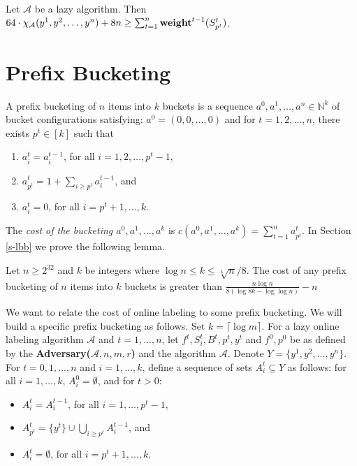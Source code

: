 \documentclass[runningheads,a4paper]{llncs}
\newcommand{\A}{\mathcal{A}}
\newcommand{\N}{\mathbb{N}}
\newcommand{\weight}{{\rm {\bf weight}}}
\begin{document}
\begin{corollary}\label{c-main}
Let $\A$ be a lazy algorithm. Then $64 \cdot \chi_\A(y^1,y^2,\dots,y^n) + 8n \ge \sum_{t=1}^n \weight^{t-1}(S^t_{p^t})$.
\end{corollary}


\section{Prefix Bucketing}

A prefix bucketing of $n$ items into $k$ buckets is a sequence $a^0,a^1,\dots,a^n\in \N^k$ of bucket configurations
satisfying: $a^0 = (0,0,\dots,0)$ and for $t=1,2,\dots,n$, there exists $p^{t} \in [k]$ such that
\begin{enumerate}
\item $a^t_i = a^{t-1}_i$, for all $i=1,2,\dots,p^{t}-1$, 
\item $a^t_{p^{t}} = 1+ \sum_{i\ge p^{t}} a^{t-1}_i$, and
\item $a^t_i = 0$, for all $i=p^{t}+1,\dots,k$.
\end{enumerate}

The \emph{cost of the bucketing $a^0,a^1,\dots,a^k$} is $c(a^0,a^1,\dots,a^k) = \sum_{t=1}^n a^t_{p^{t}}$. In Section \ref{s-lbb}
we prove the following lemma.

\begin{lemma}\label{l-lbb}
Let $n \ge 2^{32}$ and $k$ be integers where $\log n \le k \le \sqrt[4]{n}/8$.
The cost of any prefix bucketing of $n$ items into $k$ buckets is greater than $\frac{n \log n}{8 (\log 8k - \log \log n)} - n$
\end{lemma}

We want to relate the cost of online labeling to some prefix bucketing. We will build a specific prefix
bucketing as follows. Set $k=\lceil \log m\rceil$.
For a lazy online labeling algorithm $\A$ and $t=1,\dots,n$, let $f^t,S^t_i,B^t,p^{t},y^t$ and $f^0,p^0$ be as 
defined by the {\bf Adversary($\A,n,m,r$)} and the algorithm $\A$. Denote $Y=\{y^1,y^2,\dots,y^n\}$.
For $t=0,1,\dots,n$ and $i=1,\dots,k$, define a sequence of sets $A^t_i \subseteq Y$ as follows:
for all $i=1,\dots,k$, $A^0_i = \emptyset$, and for $t>0$:
\begin{itemize}
\item $A^t_i = A^{t-1}_i$, for all $i=1,\dots,p^{t}-1$, 
\item $A^t_{p^{t}} = \{y^t\} \cup \bigcup_{i\ge p^{t}} A^{t-1}_i$, and
\item $A^t_i = \emptyset$, for all $i=p^{t}+1,\dots, k$.
\end{itemize} 
\end{document}

